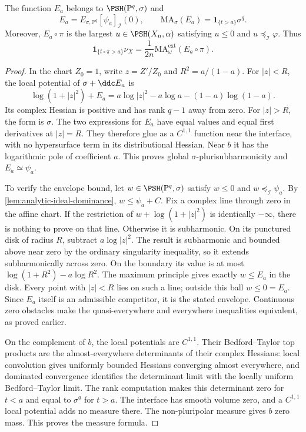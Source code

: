 \begin{proposition}\label{prop:hopf-point-envelope}
The function $E_a$ belongs to $\PSH(\mathbb P^q,\sigma)$ and
\[
 E_a=E_{\sigma,\mathbb P^q}[\psi_a]_{\mathcal I}(0),
 \qquad
 \mathrm{MA}_\sigma(E_a)=\mathbf1_{\{t>a\}}\sigma^q.
\]
Moreover, $E_a\circ\pi$ is the largest $u\in\PSH(X_n,\alpha)$ satisfying $u\leq0$ and $u\preceq_{\mathcal I}\varphi$. Thus
\[
 \mathbf1_{\{t\circ\pi>a\}}\nu_X
       =\frac1{2n}\mathrm{MA}^{\mathrm{ext}}_\omega(E_a\circ\pi).
\]
\end{proposition}
\begin{proof}
In the chart $Z_0=1$, write $z=Z'/Z_0$ and $R^2=a/(1-a)$. For $|z|<R$, the local potential of $\sigma+\ddc E_a$ is
\[
 \log(1+|z|^2)+E_a
       =a\log|z|^2-a\log a-(1-a)\log(1-a).
\]
Its complex Hessian is positive and has rank $q-1$ away from zero. For $|z|>R$, the form is $\sigma$. The two expressions for $E_a$ have equal values and equal first derivatives at $|z|=R$. They therefore glue as a $C^{1,1}$ function near the interface, with no hypersurface term in its distributional Hessian. Near $b$ it has the logarithmic pole of coefficient $a$. This proves global $\sigma$-plurisubharmonicity and $E_a\simeq\psi_a$.

To verify the envelope bound, let $w\in\PSH(\mathbb P^q,\sigma)$ satisfy $w\leq0$ and $w\preceq_{\mathcal I}\psi_a$. By \cref{lem:analytic-ideal-dominance}, $w\leq\psi_a+C$. Fix a complex line through zero in the affine chart. If the restriction of $w+\log(1+|z|^2)$ is identically $-\infty$, there is nothing to prove on that line. Otherwise it is subharmonic. On its punctured disk of radius $R$, subtract $a\log|z|^2$. The result is subharmonic and bounded above near zero by the ordinary singularity inequality, so it extends subharmonically across zero. On the boundary its value is at most $\log(1+R^2)-a\log R^2$. The maximum principle gives exactly $w\leq E_a$ in the disk. Every point with $|z|<R$ lies on such a line; outside this ball $w\leq0=E_a$. Since $E_a$ itself is an admissible competitor, it is the stated envelope. Continuous zero obstacles make the quasi-everywhere and everywhere inequalities equivalent, as proved earlier.

On the complement of $b$, the local potentials are $C^{1,1}$. Their Bedford--Taylor top products are the almost-everywhere determinants of their complex Hessians: local convolution gives uniformly bounded Hessians converging almost everywhere, and dominated convergence identifies the determinant limit with the locally uniform Bedford--Taylor limit. The rank computation makes this determinant zero for $t<a$ and equal to $\sigma^q$ for $t>a$. The interface has smooth volume zero, and a $C^{1,1}$ local potential adds no measure there. The non-pluripolar measure gives $b$ zero mass. This proves the measure formula.


\end{proof}
